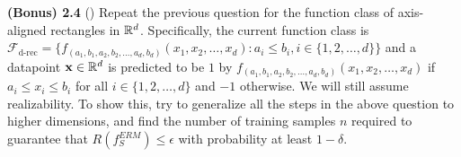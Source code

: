 \textbf{(Bonus) 2.4} () Repeat the previous question for the function class of axis-aligned rectangles in $\mathbb{R}^d$. Specifically, the current function class is $\mathcal{F}_{\text{d-rec}}=\{f_{(a_1,b_1,a_2,b_2,\dots,a_d,b_d)}(x_1,x_2,\dots,x_d):a_i\leq b_i, i\in\{1,2,\dots,d\}\}$ and a datapoint $\mathbf{x}\in\mathbb{R}^d$ is predicted to be $1$ by $f_{(a_1,b_1,a_2,b_2,\dots,a_d,b_d)}(x_1,x_2,\dots,x_d)$ if $a_i\leq x_i\leq b_i$ for all $i\in\{1,2,\dots,d\}$ and $-1$ otherwise. We will still assume realizability. To show this, try to generalize all the steps in the above question to higher dimensions, and find the number of training samples $n$ required to guarantee that $R(f_S^{ERM})\le \epsilon$ with probability at least $1-\delta$. 
